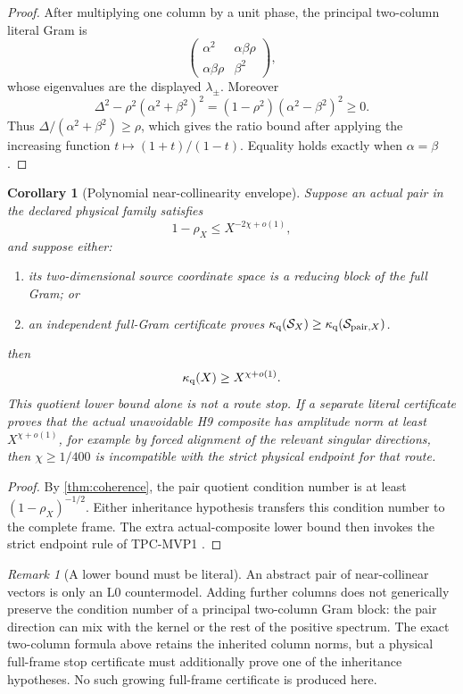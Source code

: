 \documentclass[11pt]{article}
\newtheorem{corollary}[theorem]{Corollary}
\theoremstyle{definition}
\theoremstyle{remark}
\newtheorem{remark}[theorem]{Remark}
\newcommand{\Lzero}{\mathrm{L0}}
\newcommand{\Syn}{\mathcal S}
\begin{document}
\begin{proof}
After multiplying one column by a unit phase, the principal
two-column literal Gram is
\[
 \begin{pmatrix}
  \alpha^2&\alpha\beta\rho\\
  \alpha\beta\rho&\beta^2
 \end{pmatrix},
\]
whose eigenvalues are the displayed \(\lambda_\pm\).  Moreover
\[
 \Delta^2-\rho^2(\alpha^2+\beta^2)^2
 =(1-\rho^2)(\alpha^2-\beta^2)^2\ge0.
\]
Thus \(\Delta/(\alpha^2+\beta^2)\ge\rho\), which gives the ratio
bound after applying the increasing function
\(t\mapsto(1+t)/(1-t)\).  Equality holds exactly when
\(\alpha=\beta\).
\end{proof}

\begin{corollary}[Polynomial near-collinearity envelope]
Suppose an actual pair in the declared physical family
satisfies
\[
 1-\rho_X\le X^{-2\chi+o(1)},
\]
and suppose either:
\begin{enumerate}[label=(\roman*),leftmargin=2em]
\item its two-dimensional source coordinate space is a reducing block
  of the full Gram; or
\item an independent full-Gram certificate proves
  \(\kappa_{\rm q}(\Syn_X)\ge
    \kappa_{\rm q}(\Syn_{{\rm pair},X})\).
\end{enumerate}
then
\[
 \kappa_{\rm q}(X)\ge X^{\chi+o(1)}.
\]
This quotient lower bound alone is not a route stop.  If a separate
literal certificate proves that the actual unavoidable H9 composite
has amplitude norm at least \(X^{\chi+o(1)}\), for example by forced
alignment of the relevant singular directions, then
\(\chi\ge1/400\) is incompatible with the strict physical endpoint
for that route.
\end{corollary}

\begin{proof}
By \cref{thm:coherence}, the pair quotient condition number is at least
\((1-\rho_X)^{-1/2}\).  Either inheritance hypothesis transfers this
condition number to the complete frame.  The extra actual-composite
lower bound then invokes the strict endpoint rule of TPC-MVP1
\citep{WangMVP1}.
\end{proof}

\begin{remark}[A lower bound must be literal]
An abstract pair of near-collinear vectors is only an \(\Lzero\)
countermodel.  Adding further columns does not generically preserve
the condition number of a principal two-column Gram block: the pair
direction can mix with the kernel or the rest of the positive
spectrum.  The exact two-column formula above retains the inherited
column norms, but a physical full-frame stop certificate must
additionally prove one of the inheritance hypotheses.  No such
growing full-frame certificate is produced here.
\end{remark}
\end{document}
